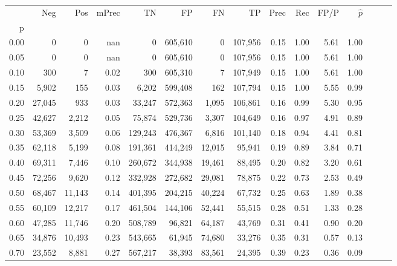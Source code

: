 \begin{tabular}{rrrrrrrrrrrrrrr}
\toprule
{} &     Neg &     Pos & mPrec &       TN &       FP &       FN &       TP &  Prec &   Rec &  FP/P & $\hat{p}$ \\
p    &         &         &       &          &          &          &          &       &       &       &           \\
\midrule
0.00 &       0 &       0 &   nan &        0 &  605,610 &        0 &  107,956 &  0.15 &  1.00 &  5.61 &      1.00 \\
0.05 &       0 &       0 &   nan &        0 &  605,610 &        0 &  107,956 &  0.15 &  1.00 &  5.61 &      1.00 \\
0.10 &     300 &       7 &  0.02 &      300 &  605,310 &        7 &  107,949 &  0.15 &  1.00 &  5.61 &      1.00 \\
0.15 &   5,902 &     155 &  0.03 &    6,202 &  599,408 &      162 &  107,794 &  0.15 &  1.00 &  5.55 &      0.99 \\
0.20 &  27,045 &     933 &  0.03 &   33,247 &  572,363 &    1,095 &  106,861 &  0.16 &  0.99 &  5.30 &      0.95 \\
0.25 &  42,627 &   2,212 &  0.05 &   75,874 &  529,736 &    3,307 &  104,649 &  0.16 &  0.97 &  4.91 &      0.89 \\
0.30 &  53,369 &   3,509 &  0.06 &  129,243 &  476,367 &    6,816 &  101,140 &  0.18 &  0.94 &  4.41 &      0.81 \\
0.35 &  62,118 &   5,199 &  0.08 &  191,361 &  414,249 &   12,015 &   95,941 &  0.19 &  0.89 &  3.84 &      0.71 \\
0.40 &  69,311 &   7,446 &  0.10 &  260,672 &  344,938 &   19,461 &   88,495 &  0.20 &  0.82 &  3.20 &      0.61 \\
0.45 &  72,256 &   9,620 &  0.12 &  332,928 &  272,682 &   29,081 &   78,875 &  0.22 &  0.73 &  2.53 &      0.49 \\
0.50 &  68,467 &  11,143 &  0.14 &  401,395 &  204,215 &   40,224 &   67,732 &  0.25 &  0.63 &  1.89 &      0.38 \\
0.55 &  60,109 &  12,217 &  0.17 &  461,504 &  144,106 &   52,441 &   55,515 &  0.28 &  0.51 &  1.33 &      0.28 \\
0.60 &  47,285 &  11,746 &  0.20 &  508,789 &   96,821 &   64,187 &   43,769 &  0.31 &  0.41 &  0.90 &      0.20 \\
0.65 &  34,876 &  10,493 &  0.23 &  543,665 &   61,945 &   74,680 &   33,276 &  0.35 &  0.31 &  0.57 &      0.13 \\
0.70 &  23,552 &   8,881 &  0.27 &  567,217 &   38,393 &   83,561 &   24,395 &  0.39 &  0.23 &  0.36 &      0.09 \\

\end{tabular}
